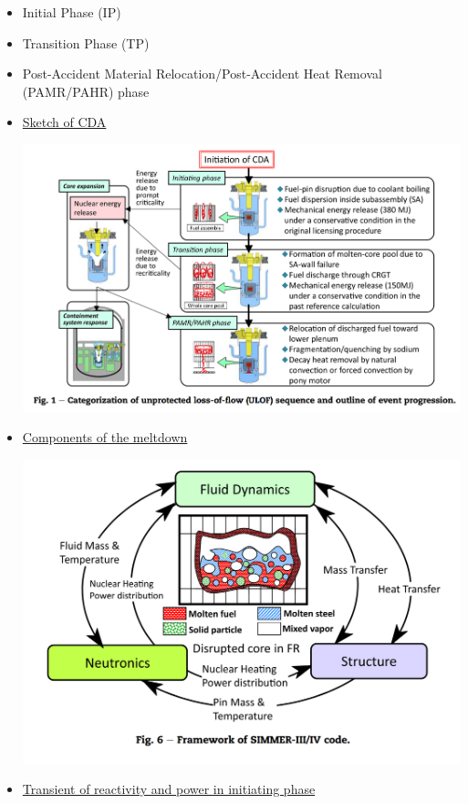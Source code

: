\documentclass[11pt]{article}
\begin{document}
\begin{itemize}
\item Initial Phase (IP)
\item Transition Phase (TP)
\item Post-Accident Material Relocation/Post-Accident Heat Removal (PAMR/PAHR) phase
\item \href{images/CDA.png}{Sketch of CDA}
\begin{center}
\includegraphics[width=.9\linewidth]{images/CDA.png}
\end{center}
\item \href{images/framework\_code.png}{Components of the meltdown}
\begin{center}
\includegraphics[width=.9\linewidth]{images/framework_code.png}
\end{center}
\item \href{images/transient.png}{Transient of reactivity and power in initiating phase}
\begin{center}

\end{center}
\end{itemize}
\end{document}
